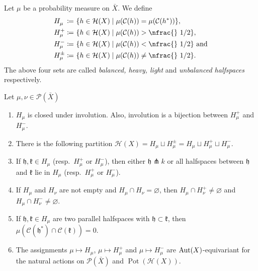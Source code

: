 \begin{defin}
  Let \(\mu\) be a probability measure on \(\bar X\). We define
  \begin{align*}
    H_\mu^{\phantom{+}} \coloneqq &\ \{h \in \mathcal{H}(X) \mid \mu(\mathcal{C}(h)) = \mu(\mathcal{C}(h^\ast))\},\\
    H_\mu^+ \coloneqq &\ \{h \in \mathcal{H}(X) \mid \mu(\mathcal{C}(h)) > \text{\nfrac{} 1/2} \},\\
    H_\mu^- \coloneqq &\ \{h \in \mathcal{H}(X) \mid \mu(\mathcal{C}(h)) < \text{\nfrac{} 1/2}\} \text{ and}\\
    H_\mu^\pm \coloneqq &\ \{h \in \mathcal{H}(X) \mid \mu(\mathcal{C}(h)) \neq \text{\nfrac{} 1/2}\}.
  \end{align*} 
  The above four sets are called \emph{balanced, heavy, light} and \emph{unbalanced halfspaces} respectively.
\end{defin}

\begin{lemma}[{\cite[Lem.\ 4.6]{MR3509968}}]
  \label{lem:4.6}
  Let \(\mu,\nu \in \mathcal{P}(\bar X)\)
  \begin{enumerate}
  \item \(H_\mu\) is closed under involution. Also, involution is a bijection between \(H_\mu^+\) and \(H_\mu^-\).
  \item There is the following partition \(\mathcal{H}(X) = H_\mu \sqcup H_\mu^\pm = H_\mu \sqcup H_\mu^+ \sqcup H_\mu^-\).
  \item If \(\mathfrak{h, k} \in H_\mu\) (resp.\ \(H_\mu^+\) or \(H_\mu^-\)), then either \(\mathfrak{h} \pitchfork k\) or all halfspaces between \(\mathfrak{h}\) and \(\mathfrak{k}\) lie in \(H_\mu\) (resp.\ \(H_\mu^+\) or \(H_\mu^-\)).
  \item If \(H_\mu\) and \(H_\nu\) are not empty and \(H_\mu \cap H_\nu = \varnothing\), then \(H_\mu \cap H_\nu^+ \neq \varnothing\) and \(H_\mu \cap H_\nu^- \neq \varnothing\).
  \item If \(\mathfrak{h, k}  \in H_\mu\) are two parallel halfspaces with \(\mathfrak{h} \subset \mathfrak{k}\), then \(\mu(\mathcal{C}(\mathfrak{h}^\ast) \cap \mathcal{C}(\mathfrak{k})) = 0\).
  \item The assignments \(\mu \mapsto H_\mu\), \(\mu \mapsto H_\mu^+\) and \(\mu \mapsto H_\mu^-\) are \(\operatorname{Aut}(X)\)-equivariant for the natural actions on \(\mathcal{P}(\bar X)\) and \(\operatorname{Pot}(\mathcal{H}(X))\).
  \end{enumerate}
\end{lemma}

